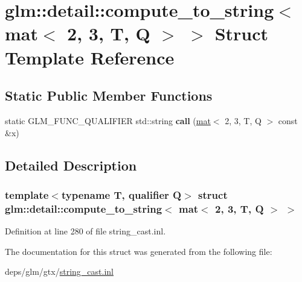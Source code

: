 \hypertarget{structglm_1_1detail_1_1compute__to__string_3_01mat_3_012_00_013_00_01T_00_01Q_01_4_01_4}{}\section{glm\+:\+:detail\+:\+:compute\+\_\+to\+\_\+string$<$ mat$<$ 2, 3, T, Q $>$ $>$ Struct Template Reference}
\label{structglm_1_1detail_1_1compute__to__string_3_01mat_3_012_00_013_00_01T_00_01Q_01_4_01_4}
\subsection*{Static Public Member Functions}
\begin{DoxyCompactItemize}
\item 
\mbox{\label{structglm_1_1detail_1_1compute__to__string_3_01mat_3_012_00_013_00_01T_00_01Q_01_4_01_4_a1459d67dba1cee7c2467271a97fab304}} 
static G\+L\+M\+\_\+\+F\+U\+N\+C\+\_\+\+Q\+U\+A\+L\+I\+F\+I\+ER std\+::string {\bfseries call} (\hyperlink{structglm_1_1mat}{mat}$<$ 2, 3, T, Q $>$ const \&x)
\end{DoxyCompactItemize}


\subsection{Detailed Description}
\subsubsection*{template$<$typename T, qualifier Q$>$\newline
struct glm\+::detail\+::compute\+\_\+to\+\_\+string$<$ mat$<$ 2, 3, T, Q $>$ $>$}



Definition at line 280 of file string\+\_\+cast.\+inl.



The documentation for this struct was generated from the following file\+:\begin{DoxyCompactItemize}
\item 
deps/glm/gtx/\hyperlink{string__cast_8inl}{string\+\_\+cast.\+inl}\end{DoxyCompactItemize}
